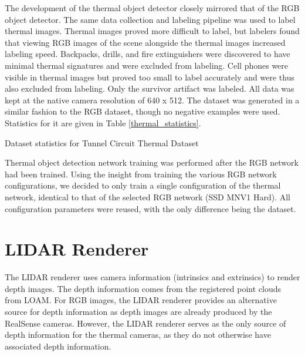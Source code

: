 The development of the thermal object detector closely mirrored that of the RGB object detector. The same data collection and labeling pipeline was used to label thermal images. Thermal images proved more difficult to label, but labelers found that viewing RGB images of the scene alongside the thermal images increased labeling speed. Backpacks, drills, and fire extinguishers were discovered to have minimal thermal signatures and were excluded from labeling. Cell phones were visible in thermal images but proved too small to label accurately and were thus also excluded from labeling. Only the survivor artifact was labeled. All data was kept at the native camera resolution of 640 x 512. The dataset was generated in a similar fashion to the RGB dataset, though no negative examples were used. Statistics for it are given in Table \ref{thermal_statistics}.

\begin{table}
	\centering
	\begin{adjustbox}{max width=.9\textwidth}
	\end{adjustbox}
	\caption{Dataset statistics for Tunnel Circuit Thermal Dataset}
	\label{thermal_statistics}
\end{table}

Thermal object detection network training was performed after the RGB network had been trained. Using the insight from training the various RGB network configurations, we decided to only train a single configuration of the thermal network, identical to that of the selected RGB network (SSD MNV1 Hard). All configuration parameters were reused, with the only difference being the dataset.

\section{LIDAR Renderer}

The LIDAR renderer uses camera information (intrinsics and extrinsics) to render depth images. The depth information comes from the registered point clouds from LOAM. For RGB images, the LIDAR renderer provides an alternative source for depth information as depth images are already produced by the RealSense cameras. However, the LIDAR renderer serves as the only source of depth information for the thermal cameras, as they do not otherwise have associated depth information.

